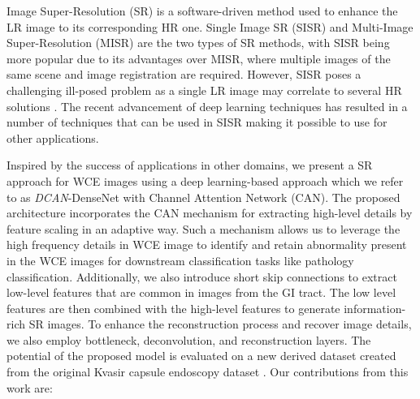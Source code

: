 \documentclass[conference]{IEEEtran}
\begin{document}
Image Super-Resolution (SR) is a software-driven method used to enhance the LR image to its corresponding HR one. Single Image SR (SISR) and Multi-Image Super-Resolution (MISR) are the two types of SR methods, with SISR being more popular due to its advantages over MISR, where multiple images of the same scene and image registration are required. However, SISR poses a challenging ill-posed problem as a single LR image may correlate to several HR solutions \cite{SISR}. The recent advancement of deep learning techniques has resulted in a number of techniques that can be used in SISR making it possible to use for other applications.


Inspired by the success of applications in other domains, we present a SR approach for WCE images using a deep learning-based approach which we refer to as \emph{DCAN}-DenseNet with Channel Attention Network (CAN). The proposed architecture incorporates the CAN mechanism for extracting high-level details by feature scaling in an adaptive way. Such a mechanism allows us to leverage the high frequency details in WCE image to identify and retain abnormality present in the WCE images for downstream classification tasks like pathology classification. Additionally, we also introduce short skip connections to extract low-level features that are common in images from the GI tract. The low level features are then combined with the high-level features to generate information-rich SR images. To enhance the reconstruction process and recover image details, we also employ bottleneck, deconvolution, and reconstruction layers. The potential of the proposed model is evaluated on a new derived dataset created from the original Kvasir capsule endoscopy dataset \cite{data}. Our contributions from this work are:
\end{document}
